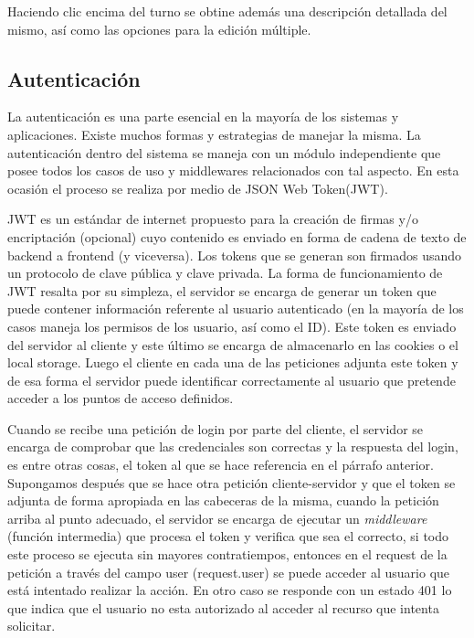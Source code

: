 Haciendo clic encima del turno se obtine además una descripción detallada del mismo, así como las opciones para la edición múltiple.

\subsection{Autenticación}

La autenticación es una parte esencial en la mayoría de los sistemas y aplicaciones. Existe muchos formas y estrategias de manejar la misma. La autenticación dentro del sistema se maneja con un módulo independiente que posee todos los casos de uso y middlewares relacionados con tal aspecto. En esta ocasión el proceso se realiza por medio de JSON Web Token(JWT).

JWT es un estándar de internet propuesto para la creación de firmas y/o encriptación (opcional) cuyo contenido es enviado en forma de cadena de texto de backend a frontend (y viceversa). Los tokens que se generan son firmados usando un protocolo de clave pública y clave privada. La forma de funcionamiento de JWT resalta por su simpleza, el servidor se encarga de generar un token que puede contener información referente al usuario autenticado (en la mayoría de los casos maneja los permisos de los usuario, así como el ID). Este token es enviado del servidor al cliente y este último se encarga de almacenarlo en las cookies o el local storage. Luego el cliente en cada una de las peticiones adjunta este token y de esa forma el servidor puede identificar correctamente al usuario que pretende acceder a los puntos de acceso definidos.\cite{jwt_wiki}

Cuando se recibe una petición de login por parte del cliente, el servidor se encarga de comprobar que las credenciales son correctas y la respuesta del login, es entre otras cosas, el token al que se hace referencia en el párrafo anterior. Supongamos después que se hace otra petición cliente-servidor y que el token se adjunta de forma apropiada en las cabeceras de la misma, cuando la petición arriba al punto adecuado, el servidor se encarga de ejecutar un \textit{middleware} (función intermedia) que procesa el token y verifica que sea el correcto, si todo este proceso se ejecuta sin mayores contratiempos, entonces en el request de la petición a través del campo user (request.user) se puede acceder al usuario que está intentado realizar la acción. En otro caso se responde con un estado 401 lo que indica que el usuario no esta autorizado al acceder al recurso que intenta solicitar. 

